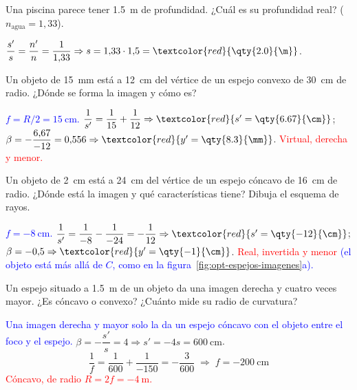 \begin{exercise}
    Una piscina parece tener \qty{1.5}{\m} de profundidad. ¿Cuál es su profundidad real? (\(n_{\text{agua}} = 1{,}33\)).
    \begin{solu}
        \(\dfrac{s'}{s} = \dfrac{n'}{n} = \dfrac{1}{1{,}33} \Rightarrow s = 1{,}33\cdot 1{,}5 = \textcolor{red}{\qty{2.0}{\m}}\).
    \end{solu}
\end{exercise}

\begin{exercise}
    Un objeto de \qty{15}{\mm} está a \qty{12}{\cm} del vértice de un espejo convexo de \qty{30}{\cm} de radio. ¿Dónde se
    forma la imagen y cómo es?
    \begin{solu}
        \textcolor{blue}{\(f = R/2 = \qty{15}{\cm}\).} \(\dfrac{1}{s'} = \dfrac{1}{15} + \dfrac{1}{12} \Rightarrow \textcolor{red}{s' = \qty{6.67}{\cm}}\);
        \(\beta = -\dfrac{6{,}67}{-12} = 0{,}556 \Rightarrow \textcolor{red}{y' = \qty{8.3}{\mm}}\).
        \textcolor{red}{Virtual, derecha y menor.}
    \end{solu}
\end{exercise}

\begin{exercise}
    Un objeto de \qty{2}{\cm} está a \qty{24}{\cm} del vértice de un espejo cóncavo de \qty{16}{\cm} de radio. ¿Dónde está
    la imagen y qué características tiene? Dibuja el esquema de rayos.
    \begin{solu}
        \textcolor{blue}{\(f = \qty{-8}{\cm}\).} \(\dfrac{1}{s'} = \dfrac{1}{-8} - \dfrac{1}{-24} = -\dfrac{1}{12} \Rightarrow \textcolor{red}{s' = \qty{-12}{\cm}}\);
        \(\beta = -0{,}5 \Rightarrow \textcolor{red}{y' = \qty{-1}{\cm}}\).
        \textcolor{red}{Real, invertida y menor} \textcolor{blue}{(el objeto está más allá de \(C\), como en la figura~\ref{fig:opt-espejos-imagenes}a).}
    \end{solu}
\end{exercise}

\begin{exercise}
    Un espejo situado a \qty{1.5}{\m} de un objeto da una imagen derecha y cuatro veces mayor. ¿Es cóncavo o convexo?
    ¿Cuánto mide su radio de curvatura?
    \begin{solu}
        \textcolor{blue}{Una imagen derecha y mayor solo la da un espejo cóncavo con el objeto entre el foco y el espejo.}
        \(\beta = -\dfrac{s'}{s} = 4 \Rightarrow s' = -4s = \qty{600}{\cm}\).
        \[ \dfrac{1}{f} = \dfrac{1}{600} + \dfrac{1}{-150} = -\dfrac{3}{600} \;\Rightarrow\; f = \qty{-200}{\cm} \]
        \textcolor{red}{Cóncavo, de radio \(R = 2f = \qty{-4}{\m}\).}
    \end{solu}
\end{exercise}

